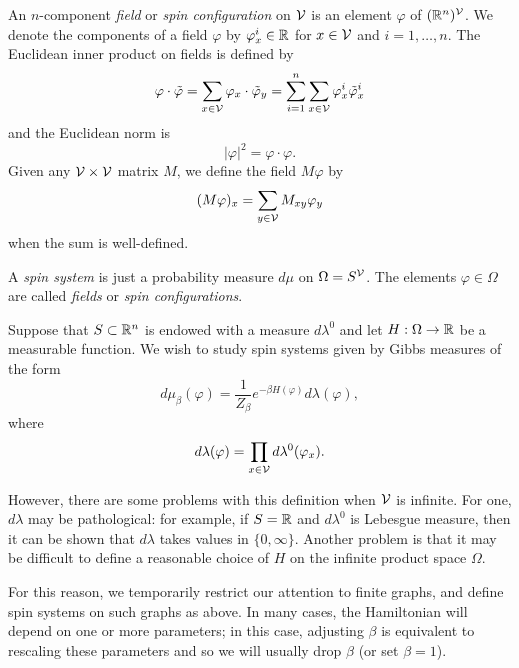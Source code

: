 An $n$-component \emph{field} or \emph{spin configuration} on $\mathcal{V}$
is an element $\varphi$ of $({\mathbb R}^n)^{\mathcal{V}}$.
We denote the components of a field $\varphi$
by $\varphi^i_x \in {\mathbb R}$ for $x \in \mathcal{V}$ and $i = 1, \ldots, n$.
The Euclidean inner product on fields is defined by
\begin{equation}
\varphi\cdot\tilde\varphi
  =
\sum_{x\in\mathcal{V}} \varphi_x \cdot \tilde\varphi_y
  =
\sum_{i=1}^n \sum_{x\in\mathcal{V}} \varphi^i_x \tilde\varphi^i_x
\end{equation}
and the Euclidean norm is
\begin{equation}
|\varphi|^2 = \varphi \cdot \varphi.
\end{equation}
Given any $\mathcal{V}\times\mathcal{V}$ matrix $M$, we define the field $M \varphi$ by
\begin{equation}
(M \varphi)_x = \sum_{y\in\mathcal{V}} M_{xy} \varphi_y
\end{equation}
when the sum is well-defined.

A \emph{spin system} is just a probability measure $d\mu$ on $\Omega = S^{\mathcal{V}}$.
The elements $\varphi \in \Omega$ are called \emph{fields} or \emph{spin configurations}.

Suppose that $S \subset {\mathbb R}^n$ is endowed with a measure $d\lambda^0$ and let
$H : \Omega \rightarrow {\mathbb R}$ be a measurable function.
We wish to study spin systems given by Gibbs measures of the form
\begin{equation}
d\mu_\beta(\varphi) = \frac{1}{Z_\beta} e^{-\beta H(\varphi)} d\lambda(\varphi),
\end{equation}
where
\begin{equation}
d\lambda(\varphi) = \prod_{x\in\mathcal{V}} d\lambda^0(\varphi_x).
\end{equation}

However, there are some problems with this definition when $\mathcal{V}$ is infinite.
For one, $d\lambda$ may be pathological: for example, if $S = {\mathbb R}$ and $d\lambda^0$
is Lebesgue measure, then it can be shown that $d\lambda$ takes values in $\{0, \infty\}$.
Another problem is that it may be difficult to define a reasonable choice of $H$ on the
infinite product space $\Omega$.

For this reason, we temporarily restrict our attention to finite graphs, and define spin
systems on such graphs as above. In many cases, the Hamiltonian will depend on one or
more parameters; in this case, adjusting $\beta$ is equivalent to rescaling these parameters
and so we will usually drop $\beta$ (or set $\beta = 1$).

